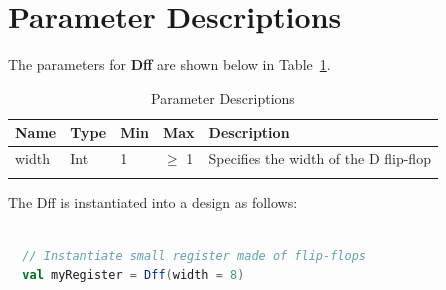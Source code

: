 
\section{Parameter Descriptions}

The parameters for \textbf{Dff} are shown below in
Table~\ref{table:params}.

\renewcommand*{\arraystretch}{1.4}
\begin{longtable}[H]{
    | p{}
    | p{}
    | p{}
    | p{}
    | p{} |
  }
  \hline
  \textbf{Name} &
  \textbf{Type} &
  \textbf{Min}  &
  \textbf{Max}  &
  \textbf{Description}                   \\ \hline \hline

  width         &
  Int           &
  1             &
  $\ge$ 1       &
  Specifies the width of the D flip-flop \\ \hline

  \caption{Parameter Descriptions}\label{table:params}
\end{longtable}

The Dff is instantiated into a design as follows:

\begin{lstlisting}[language=Scala]

  // Instantiate small register made of flip-flops
  val myRegister = Dff(width = 8)

  \end{lstlisting}